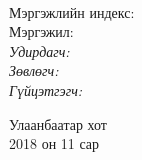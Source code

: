 
\begin{titlepage}
\begin{center}

{\scshape\LARGE \univname\par} %
{\scshape\Large \facname\par}\vspace{0.5cm} %

\vspace{2cm}
\hfill \large{\deptname} \\

\vspace{2cm}

{\huge \bfseries \ttitle\par}\vspace{0.4cm} %

\vspace{2cm}

\begin{minipage}[t] {0.9\textwidth}
\begin{flushleft} 
\normalsize

Мэргэжлийн индекс: \degreeid \\
Мэргэжил: \degreename \\[2cm]

\emph{Удирдагч:} {\supname} \\%
\emph{Зөвлөгч:} {\advicename} \\ %
\emph{Гүйцэтгэгч:} {\shortname} \\ %

\end{flushleft}
\end{minipage}

\vfill

\large {Улаанбаатар хот} \\
{\large 2018 он 11 сар}\\ %

\end{center}
\end{titlepage}

 